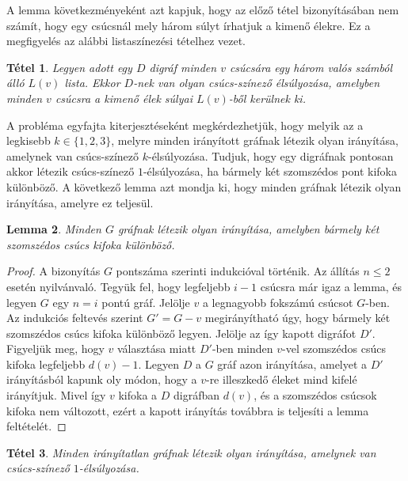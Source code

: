 \documentclass[12pt, a4paper]{report}
\newtheorem{tét}{Tétel}[section]
\newtheorem{lem}[tét]{Lemma}
\theoremstyle{remark}
\theoremstyle{definition}
\begin{document}
A lemma következményeként azt kapjuk, hogy az előző tétel bizonyításában nem számít, hogy egy csúcsnál mely három súlyt írhatjuk a kimenő élekre. Ez a megfigyelés az alábbi listaszínezési tételhez vezet.

\begin{tét}
Legyen adott egy $D$ digráf minden $v$ csúcsára egy három valós számból álló $L(v)$ lista. Ekkor $D$-nek van olyan csúcs-színező élsúlyozása, amelyben minden $v$ csúcsra a kimenő élek súlyai $L(v)$-ből kerülnek ki.
\end{tét}

A probléma egyfajta kiterjesztéseként megkérdezhetjük, hogy melyik az a legkisebb $k \in \lbrace 1, 2, 3 \rbrace$, melyre minden irányított gráfnak létezik olyan irányítása, amelynek van csúcs-színező $k$-élsúlyozása. Tudjuk, hogy egy digráfnak pontosan akkor létezik csúcs-színező $1$-élsúlyozása, ha bármely két szomszédos pont kifoka különböző. A következő lemma azt mondja ki, hogy minden gráfnak létezik olyan irányítása, amelyre ez teljesül.

\begin{lem}
Minden $G$ gráfnak létezik olyan irányítása, amelyben bármely két szomszédos csúcs kifoka különböző.
\end{lem}

\begin{proof}
A bizonyítás $G$ pontszáma szerinti indukcióval történik. Az állítás $n \leq 2$ esetén nyilvánvaló. Tegyük fel, hogy legfeljebb $i - 1$ csúcsra már igaz a lemma, és legyen $G$ egy $n = i$ pontú gráf. Jelölje $v$ a legnagyobb fokszámú csúcsot $G$-ben. Az indukciós feltevés szerint $G' = G - v$ megirányítható úgy, hogy bármely két szomszédos csúcs kifoka különböző legyen. Jelölje az így kapott digráfot $D'$. Figyeljük meg, hogy $v$ választása miatt $D'$-ben minden $v$-vel szomszédos csúcs kifoka legfeljebb $d(v) - 1$. Legyen $D$ a $G$ gráf azon irányítása, amelyet a $D'$ irányításból kapunk oly módon, hogy a $v$-re illeszkedő éleket mind kifelé irányítjuk. Mivel így $v$ kifoka a $D$ digráfban $d(v)$, és a szomszédos csúcsok kifoka nem változott, ezért a kapott irányítás továbbra is teljesíti a lemma feltételét.
\end{proof}

\begin{tét}
Minden irányítatlan gráfnak létezik olyan irányítása, amelynek van csúcs-színező $1$-élsúlyozása.
\end{tét}

\nocite{*}
\printbibliography
\end{document}
